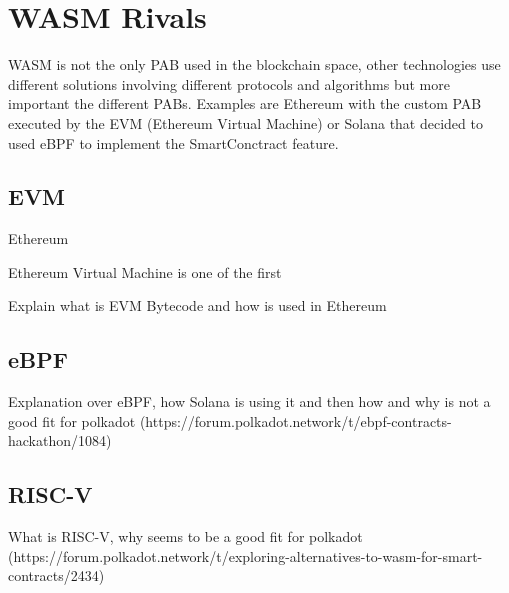 \documentclass[../main.tex]{subfiles}
\begin{document}
\section{WASM Rivals}

WASM is not the only PAB used in the blockchain space, other technologies use different solutions involving different protocols and algorithms but more important the different PABs. Examples are Ethereum with the custom PAB executed by the EVM (Ethereum Virtual Machine) or Solana that decided to used eBPF to implement the SmartConctract feature.

\subsection{EVM}

Ethereum

Ethereum Virtual Machine is one of the first

Explain what is EVM Bytecode and how is used in Ethereum

\subsection{eBPF}

Explanation over eBPF, how Solana is using it and then how and why is not a good fit for polkadot (https://forum.polkadot.network/t/ebpf-contracts-hackathon/1084)

\subsection{RISC-V}

What is RISC-V, why seems to be a good fit for polkadot (https://forum.polkadot.network/t/exploring-alternatives-to-wasm-for-smart-contracts/2434)
\end{document}
